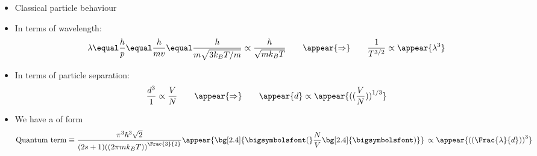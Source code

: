 \begin{frame}
\frametitle{\texorpdfstring{\culine[\sectiontitleulinecolor]{\sectiontitle}}{\sectiontitle} }

\begin{itemize}
	\item Classical particle behaviour \appear{$\leftrightarrow$} 
\appear{$\leftrightarrow$}  

\item In terms of wavelength: 
\[
\lambda  \equal \frac{h}{p}  \equal \frac{h}{m v}  \equal \frac{h}{m \sqrt{3 k_{B} T / m}} \propto \frac{h}{\sqrt{m k_{B} T}} \qquad \appear{\Rightarrow} \qquad \frac{1}{T^{3 / 2}} \propto \appear{\lambda^{3}}
\]
\item In terms of particle separation:
\[
\frac{d^{3}}{1} \propto \frac{V}{N} \qquad \appear{\Rightarrow} \qquad \appear{d} \propto \appear{\textrm{((}\frac{V}{N} \textrm{))}^{1 / 3}}
\]

\item We have a  of form 
\[
\text {Quantum term}  \equiv \frac{\pi^{3} \hbar^{3} \sqrt{2}}{(2 s+1) \textrm{((}2 \pi m k_{B} T \textrm{))}^{\Frac{3}{2}}} \appear{\bg[2.4]{\text{\bigsymbolsfont(}} \frac{N}{V} \bg[2.4]{\text{\bigsymbolsfont)}} } \,\propto \appear{\textrm{((}\Frac{\lambda}{d} \textrm{))}^{3}}
\]
\end{itemize}

\endofslide 
\end{frame}


